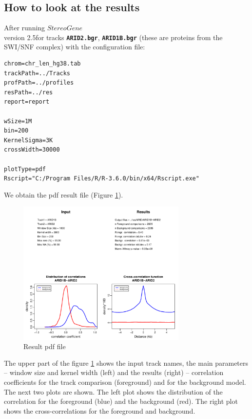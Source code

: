 \documentclass{article}
\newcommand{\tw}{\textwidth}
\newcommand{\prm}[1]{\texttt{\textbf{{#1}}}}
\newcommand{\sg}{$StereoGene$\\ version 2.5}
\begin{document}
\subsection{How to look at the results}
After running \sg for tracks \prm{ARID2.bgr}, \prm{ARID1B.bgr} (these are proteins from the SWI/SNF complex) with the configuration file:
\begin{shaded} 
\begin{footnotesize}
\begin{verbatim}
chrom=chr_len_hg38.tab
trackPath=../Tracks
profPath=../profiles
resPath=../res
report=report

wSize=1M
bin=200
KernelSigma=3K
crossWidth=30000

plotType=pdf
Rscript="C:/Program Files/R/R-3.6.0/bin/x64/Rscript.exe"
\end{verbatim}
\end{footnotesize}
\end{shaded}
We obtain the pdf result file (Figure \ref{res1}).
\begin{center}
\begin{figure}[!h]
\includegraphics[width=0.75\tw]{fig/ARID1B~ARID2.pdf}
\caption{Result pdf file}\label{res1}
\end{figure}
\end{center}


The upper part of the figure \ref{res1} shows the input track names, the main parameters -- window size and kernel width (left) and the results (right) -- correlation coefficients for the track comparison (foreground) and for the background model. 
The next two plots are shown. The left plot shows the distribution of the correlation for the foreground (blue) and the background (red). The right plot shows the cross-correlations for the foreground and background.
\end{document}
